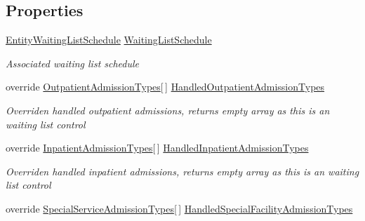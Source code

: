 \subsection*{Properties}
\begin{DoxyCompactItemize}
\item 
\hyperlink{class_general_health_care_elements_1_1_booking_models_1_1_entity_waiting_list_schedule}{Entity\+Waiting\+List\+Schedule} \hyperlink{class_general_health_care_elements_1_1_department_models_1_1_outpatient_1_1_waiting_list_1_1_out0eb5e03b9183fdbdabb1cbe4530cecf4_abc14f774cb30971494fb55cfd2973405}{Waiting\+List\+Schedule}
\begin{DoxyCompactList}\small\item\em Associated waiting list schedule \end{DoxyCompactList}\item 
override \hyperlink{class_general_health_care_elements_1_1_treatment_admission_types_1_1_outpatient_admission_types}{Outpatient\+Admission\+Types}\mbox{[}$\,$\mbox{]} \hyperlink{class_general_health_care_elements_1_1_department_models_1_1_outpatient_1_1_waiting_list_1_1_out0eb5e03b9183fdbdabb1cbe4530cecf4_a0a11d18b618aeadcb622206c88da09c2}{Handled\+Outpatient\+Admission\+Types}
\begin{DoxyCompactList}\small\item\em Overriden handled outpatient admissions, returns empty array as this is an waiting list control \end{DoxyCompactList}\item 
override \hyperlink{class_general_health_care_elements_1_1_treatment_admission_types_1_1_inpatient_admission_types}{Inpatient\+Admission\+Types}\mbox{[}$\,$\mbox{]} \hyperlink{class_general_health_care_elements_1_1_department_models_1_1_outpatient_1_1_waiting_list_1_1_out0eb5e03b9183fdbdabb1cbe4530cecf4_a945b438af3a2aed9c38c4c192ece59aa}{Handled\+Inpatient\+Admission\+Types}
\begin{DoxyCompactList}\small\item\em Overriden handled inpatient admissions, returns empty array as this is an waiting list control \end{DoxyCompactList}\item 
override \hyperlink{class_general_health_care_elements_1_1_treatment_admission_types_1_1_special_service_admission_types}{Special\+Service\+Admission\+Types}\mbox{[}$\,$\mbox{]} \hyperlink{class_general_health_care_elements_1_1_department_models_1_1_outpatient_1_1_waiting_list_1_1_out0eb5e03b9183fdbdabb1cbe4530cecf4_a5f6e751d4a6b6ecb2c62f367be0c5e86}{Handled\+Special\+Facility\+Admission\+Types}

\end{DoxyCompactItemize}
